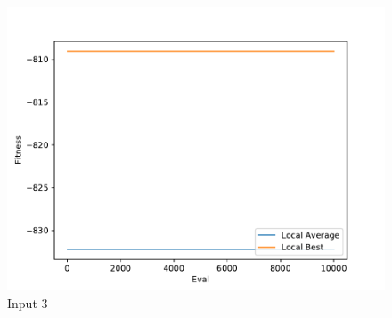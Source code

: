 \documentclass{standalone}
\begin{document}
\begin{figure}[!htb]
	\caption{Input 3}
	\label{fig:graph_3035}
	\includegraphics[width=\textwidth]{../graphs/graphs/3035.pdf}
\end{figure}
\end{document}
